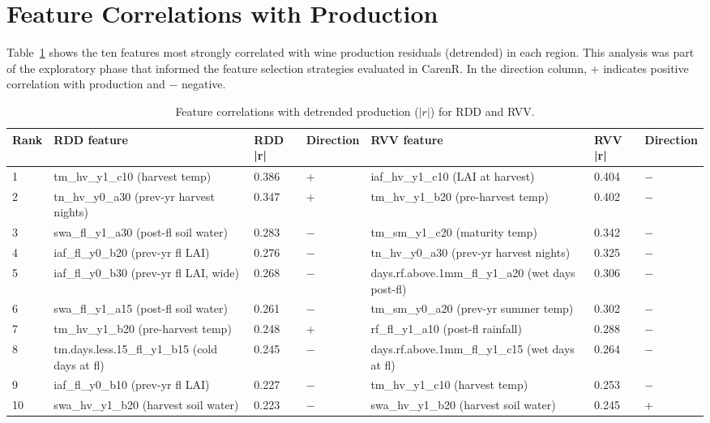 \section{Feature Correlations with Production}\label{app_sec:feature_correlations_with_production}

Table~\ref{tab:appb_5} shows the ten features most strongly correlated with wine production residuals (detrended) in each region. This analysis was part of the exploratory phase that informed the feature selection strategies evaluated in CarenR. In the direction column, + indicates positive correlation with production and $-$ negative.

\begin{table}[htbp]
  \centering
  \caption{Feature correlations with detrended production ($|r|$) for RDD and RVV.}\label{tab:appb_5}
  \footnotesize
  \begin{adjustbox}{max width=\textwidth}
    \begin{tabularx}{\textwidth}{l|p{3.4cm}|p{1.3cm}|p{1.5cm}|p{3.4cm}|p{1.3cm}|X}
  \toprule
  Rank & RDD feature & RDD |r| & Direction & RVV feature & RVV |r| & Direction \\
  \midrule
  1 & tm\_hv\_y1\_c10
(harvest temp) & 0.386 & + & iaf\_hv\_y1\_c10
(LAI at harvest) & 0.404 & $-$ \\
  2 & tn\_hv\_y0\_a30
(prev-yr harvest nights) & 0.347 & + & tm\_hv\_y1\_b20
(pre-harvest temp) & 0.402 & $-$ \\
  3 & swa\_fl\_y1\_a30
(post-fl soil water) & 0.283 & $-$ & tm\_sm\_y1\_c20
(maturity temp) & 0.342 & $-$ \\
  4 & iaf\_fl\_y0\_b20
(prev-yr fl LAI) & 0.276 & $-$ & tn\_hv\_y0\_a30
(prev-yr harvest nights) & 0.325 & $-$ \\
  5 & iaf\_fl\_y0\_b30
(prev-yr fl LAI, wide) & 0.268 & $-$ & days.rf.above.1mm\_fl\_y1\_a20
(wet days post-fl) & 0.306 & $-$ \\
  6 & swa\_fl\_y1\_a15
(post-fl soil water) & 0.261 & $-$ & tm\_sm\_y0\_a20
(prev-yr summer temp) & 0.302 & $-$ \\
  7 & tm\_hv\_y1\_b20
(pre-harvest temp) & 0.248 & + & rf\_fl\_y1\_a10
(post-fl rainfall) & 0.288 & $-$ \\
  8 & tm.days.less.15\_fl\_y1\_b15
(cold days at fl) & 0.245 & $-$ & days.rf.above.1mm\_fl\_y1\_c15
(wet days at fl) & 0.264 & $-$ \\
  9 & iaf\_fl\_y0\_b10
(prev-yr fl LAI) & 0.227 & $-$ & tm\_hv\_y1\_c10
(harvest temp) & 0.253 & $-$ \\
  10 & swa\_hv\_y1\_b20
(harvest soil water) & 0.223 & $-$ & swa\_hv\_y1\_b20
(harvest soil water) & 0.245 & + \\
  \bottomrule
  \end{tabularx}
  \end{adjustbox}

\end{table}


